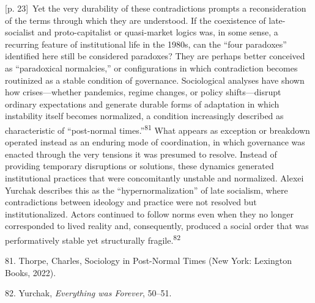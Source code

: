 \documentclass[10pt,a4paper]{article}
\begin{document}
{\scriptsize\color{gray} [p. 23]}\ Yet the very durability of these contradictions prompts a reconsideration of the terms through which they are understood. If the coexistence of late-socialist and proto-capitalist or quasi-market logics was, in some sense, a recurring feature of institutional life in the 1980s, can the “four paradoxes” identified here still be considered paradoxes? They are perhaps better conceived as “paradoxical normalcies,” or configurations in which contradiction becomes routinized as a stable condition of governance. Sociological analyses have shown how crises—whether pandemics, regime changes, or policy shifts—disrupt ordinary expectations and generate durable forms of adaptation in which instability itself becomes normalized, a condition increasingly described as characteristic of “post-normal times.”\nobreak\textsuperscript{81} What appears as exception or breakdown operated instead as an enduring mode of coordination, in which governance was enacted through the very tensions it was presumed to resolve. Instead of providing temporary disruptions or solutions, these dynamics generated institutional practices that were concomitantly unstable and normalized. Alexei Yurchak describes this as the “hypernormalization” of late socialism, where contradictions between ideology and practice were not resolved but institutionalized. Actors continued to follow norms even when they no longer corresponded to lived reality and, consequently, produced a social order that was performatively stable yet structurally fragile.\nobreak\textsuperscript{82}\par{\small 81. Thorpe, Charles, Sociology in Post-Normal Times (New York: Lexington Books, 2022).\par}{\small 82. Yurchak, \textit{Everything was Forever}, 50–51.\par}
\end{document}

